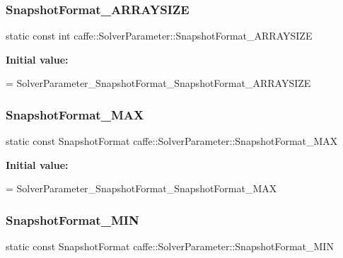 \subsubsection{\texorpdfstring{Snapshot\+Format\+\_\+\+A\+R\+R\+A\+Y\+S\+I\+ZE}{SnapshotFormat\_ARRAYSIZE}}
{\footnotesize\ttfamily static const int caffe\+::\+Solver\+Parameter\+::\+Snapshot\+Format\+\_\+\+A\+R\+R\+A\+Y\+S\+I\+ZE\hspace{0.3cm}{\ttfamily [static]}}

{\bfseries Initial value\+:}
\begin{DoxyCode}
=
    SolverParameter\_SnapshotFormat\_SnapshotFormat\_ARRAYSIZE
\end{DoxyCode}
\mbox{\label{classcaffe_1_1_solver_parameter_a8eff70e499456c61c9e1bac49dcbfd49}} 
\subsubsection{\texorpdfstring{Snapshot\+Format\+\_\+\+M\+AX}{SnapshotFormat\_MAX}}
{\footnotesize\ttfamily static const Snapshot\+Format caffe\+::\+Solver\+Parameter\+::\+Snapshot\+Format\+\_\+\+M\+AX\hspace{0.3cm}{\ttfamily [static]}}

{\bfseries Initial value\+:}
\begin{DoxyCode}
=
    SolverParameter\_SnapshotFormat\_SnapshotFormat\_MAX
\end{DoxyCode}
\mbox{\label{classcaffe_1_1_solver_parameter_a6640153a642750c5bc4d19d5755f0477}} 
\subsubsection{\texorpdfstring{Snapshot\+Format\+\_\+\+M\+IN}{SnapshotFormat\_MIN}}
{\footnotesize\ttfamily static const Snapshot\+Format caffe\+::\+Solver\+Parameter\+::\+Snapshot\+Format\+\_\+\+M\+IN\hspace{0.3cm}{\ttfamily [static]}}


